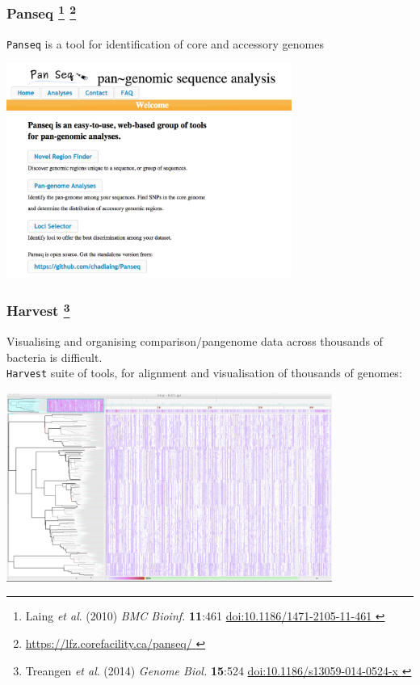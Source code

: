 \begin{frame}
  \frametitle{Panseq
  \footnote{\tiny{Laing \textit{et al}. (2010) \textit{BMC Bioinf.} \textbf{11}:461 \href{http://dx.doi.org/10.1186/1471-2105-11-461}{doi:10.1186/1471-2105-11-461
  }}}
  \footnote{\tiny{\href{https://lfz.corefacility.ca/panseq/}{https://lfz.corefacility.ca/panseq/
  }}}  }
  \texttt{Panseq} is a tool for identification of core and accessory genomes
  \begin{center}
      \includegraphics[width=0.7\textwidth]{images/panseq} 
  \end{center}
\end{frame}

%
\begin{frame}
  \frametitle{Harvest
  \footnote{\tiny{Treangen \textit{et al}. (2014) \textit{Genome Biol.} \textbf{15}:524 \href{http://dx.doi.org/10.1186/s13059-014-0524-x}{doi:10.1186/s13059-014-0524-x
  }}}
  }
  \textcolor{hutton_green}{Visualising and organising comparison/pangenome data across thousands of bacteria is difficult.}\\
  \texttt{Harvest} suite of tools, for alignment and visualisation of thousands of genomes:
  \begin{center}
      \includegraphics[width=0.8\textwidth]{images/harvest} 
  \end{center}
\end{frame}
